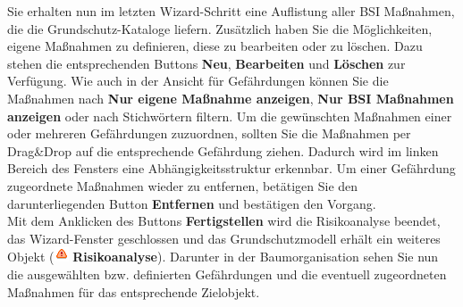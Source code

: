 \documentclass[a4paper,10pt]{book}
\begin{document}
\newline
Sie erhalten nun im letzten Wizard-Schritt eine Auflistung aller BSI Maßnahmen, die die Grundschutz-Kataloge liefern.
Zusätzlich haben Sie die Möglichkeiten, eigene Maßnahmen zu definieren, diese zu bearbeiten oder zu löschen.
Dazu stehen die entsprechenden Buttons \textbf{Neu}, \textbf{Bearbeiten} und \textbf{Löschen} zur Verfügung.
Wie auch in der Ansicht für Gefährdungen können Sie die Maßnahmen nach \textbf{Nur eigene Maßnahme anzeigen},
\textbf{Nur BSI Maßnahmen anzeigen} oder nach Stichwörtern filtern. Um die gewünschten Maßnahmen einer oder
mehreren Gefährdungen zuzuordnen, sollten Sie die Maßnahmen per {Drag\&Drop} auf die entsprechende Gefährdung ziehen.
Dadurch wird im linken Bereich des Fensters eine Abhängigkeitsstruktur erkennbar. Um einer Gefährdung zugeordnete
Maßnahmen wieder zu entfernen, betätigen Sie den darunterliegenden Button \textbf{Entfernen} und bestätigen den Vorgang.
\newline\\
Mit dem Anklicken des Buttons \textbf{Fertigstellen} wird die Risikoanalyse beendet, das Wizard-Fenster geschlossen und das Grundschutzmodell erhält ein weiteres Objekt (\includegraphics[height=2ex]{Icon/Risikoanalyse.png} \textbf{Risikoanalyse}). Darunter in der Baumorganisation sehen Sie nun die ausgewählten bzw. definierten Gefährdungen und die eventuell zugeordneten Maßnahmen für das entsprechende Zielobjekt.
\end{document}
